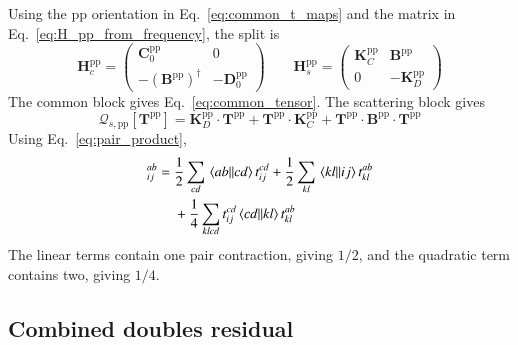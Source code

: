 \documentclass[aip,jcp,reprint,noshowkeys,superscriptaddress]{revtex4-1}
\newcommand{\pp}{\text{pp}}
\newcommand{\bT}{\boldsymbol{T}}
\newcommand{\bB}{\boldsymbol{B}}
\newcommand{\bC}{\boldsymbol{C}}
\newcommand{\bD}{\boldsymbol{D}}
\newcommand{\bH}{\boldsymbol{H}}
\newcommand{\bK}{\boldsymbol{K}}
\newcommand{\bchi}{\boldsymbol{\chi}}
\newcommand{\bcalQ}{\boldsymbol{\mathcal{Q}}}
\begin{document}
Using the $\pp$ orientation in Eq.~\eqref{eq:common_t_maps} and the
matrix in Eq.~\eqref{eq:H_pp_from_frequency}, the split is
\begin{equation}
    \bH_c^{\pp}
    =
    \begin{pmatrix}
        \bC_0^{\pp}&0\\
        -(\bB^{\pp})^{\dagger}&-\bD_0^{\pp}
    \end{pmatrix}
    \qquad
    \bH_s^{\pp}
    =
    \begin{pmatrix}
        \bK_C^{\pp}&\bB^{\pp}\\
        0&-\bK_D^{\pp}
    \end{pmatrix}
    \label{eq:split_pp}
\end{equation}
The common block gives Eq.~\eqref{eq:common_tensor}.  The
scattering block gives
\begin{equation}
    \bcalQ_{s,\pp}[\bT^{\pp}]
    =\bK_D^{\pp}\cdot\bT^{\pp}
    +\bT^{\pp}\cdot \bK_C^{\pp}
    +\bT^{\pp}\cdot \bB^{\pp}\cdot\bT^{\pp}
    \label{eq:Xi_pp_matrix}
\end{equation}
Using Eq.~\eqref{eq:pair_product},
\begin{align}
    [\bchi^{\pp}]_{ij}^{ab}
    ={}&
    \frac12\sum_{cd}\mel{ab}{}{cd}t_{ij}^{cd}
    +
    \frac12\sum_{kl}\mel{kl}{}{ij}t_{kl}^{ab}
    \nonumber\\
    &+
    \frac14\sum_{klcd}
    t_{ij}^{cd}\mel{cd}{}{kl}t_{kl}^{ab}
    \label{eq:Xi_pp_explicit}
\end{align}
The linear terms contain one pair contraction, giving $1/2$, and the
quadratic term contains two, giving $1/4$.

\subsection{Combined doubles residual}
\label{sec:combined_decoupling}
\end{document}
